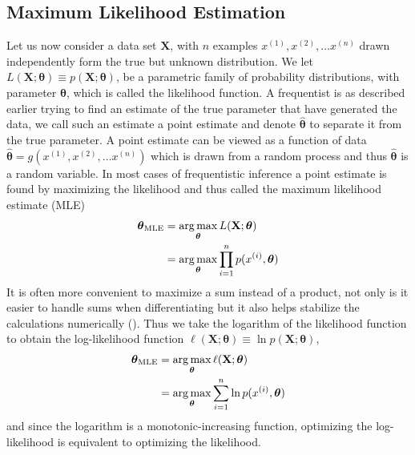 \subsection{Maximum Likelihood Estimation}
Let us now consider a data set $\mathbf{X}$, with $n$ examples $x^{(1)}, x^{(2)},\ldots x^{(n)}$ drawn independently form the true but unknown distribution. We let
$L(\mathbf{X};\boldsymbol{\theta})\equiv p(\mathbf{X};\boldsymbol{\theta})$, be a parametric family of probability distributions, with parameter $\boldsymbol{\theta}$, which is called the likelihood function. A frequentist is as described earlier trying to find an estimate of the true parameter that have generated the data, we call such an estimate a point estimate and denote $\hat{\boldsymbol{\theta}}$ to separate it from the true parameter. A point estimate can be viewed as a function of data $\hat{\boldsymbol{\theta}}=g(x^{(1)}, x^{(2)},\ldots x^{(n)})$ which is drawn from a random process and thus $\hat{\boldsymbol{\theta}}$ is a random variable.
In most cases of frequentistic inference a point estimate is found by maximizing the likelihood and thus called the maximum likelihood estimate (MLE)
\begin{equation*}
\begin{split}
        \boldsymbol{\boldsymbol{\theta}}_{\text{MLE}}&=\operatorname*{arg\,max}_{\boldsymbol{\theta}}{L(\mathbf{X};\boldsymbol{\theta})}\\
        & = \operatorname*{arg\,max}_{\boldsymbol{\theta}}{\prod^n_{i=1}p(x^{(i)},\boldsymbol{\theta})}
\end{split}
\end{equation*}
It is often more convenient to maximize a sum instead of a product, not only is it easier to handle sums when differentiating but it also helps stabilize the calculations numerically (\cite{Goodfellow-et-al-2016}). Thus we take the logarithm of the likelihood function to obtain the log-likelihood function $\ell(\mathbf{X};\boldsymbol{\theta})\equiv \ln{p(\mathbf{X};\boldsymbol{\theta})}$,
\begin{equation*}
\begin{split}
        \boldsymbol{\boldsymbol{\theta}}_{\text{MLE}}&=\operatorname*{arg\,max}_{\boldsymbol{\theta}}{\ell(\mathbf{X};\boldsymbol{\theta})}\\
        &=\operatorname*{arg\,max}_{\boldsymbol{\boldsymbol{\theta}}}{\sum^n_{i=1}\ln{p(x^{(i)},\boldsymbol{\theta})}}
\end{split}
\end{equation*}
and since the logarithm is a monotonic-increasing function, optimizing the log-likelihood is equivalent to optimizing the likelihood. \\

